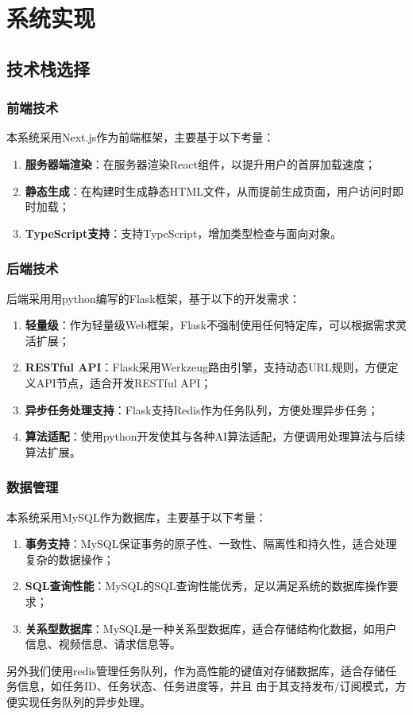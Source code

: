 \chapter{系统实现}

\section{技术栈选择}

\subsection{前端技术}

本系统采用Next.js作为前端框架，主要基于以下考量：
\begin{enumerate}
    \item \textbf{服务器端渲染}：在服务器渲染React组件，以提升用户的首屏加载速度；
    \item \textbf{静态生成}：在构建时生成静态HTML文件，从而提前生成页面，用户访问时即时加载；
    \item \textbf{TypeScript支持}：支持TypeScript，增加类型检查与面向对象。
\end{enumerate}

\subsection{后端技术}

后端采用用python编写的Flask框架，基于以下的开发需求：
\begin{enumerate}
    \item \textbf{轻量级}：作为轻量级Web框架，Flask不强制使用任何特定库，可以根据需求灵活扩展；
    \item \textbf{RESTful API}：Flask采用Werkzeug路由引擎，支持动态URL规则，方便定义API节点，适合开发RESTful API；
    \item \textbf{异步任务处理支持}：Flask支持Redis作为任务队列，方便处理异步任务；
    \item \textbf{算法适配}：使用python开发使其与各种AI算法适配，方便调用处理算法与后续算法扩展。
\end{enumerate}

\subsection{数据管理}

本系统采用MySQL作为数据库，主要基于以下考量：
\begin{enumerate}
    \item \textbf{事务支持}：MySQL保证事务的原子性、一致性、隔离性和持久性，适合处理复杂的数据操作；
    \item \textbf{SQL查询性能}：MySQL的SQL查询性能优秀，足以满足系统的数据库操作要求；
    \item \textbf{关系型数据库}：MySQL是一种关系型数据库，适合存储结构化数据，如用户信息、视频信息、请求信息等。
\end{enumerate}

另外我们使用redis管理任务队列，作为高性能的键值对存储数据库，适合存储任务信息，如任务ID、任务状态、任务进度等，并且
由于其支持发布/订阅模式，方便实现任务队列的异步处理。